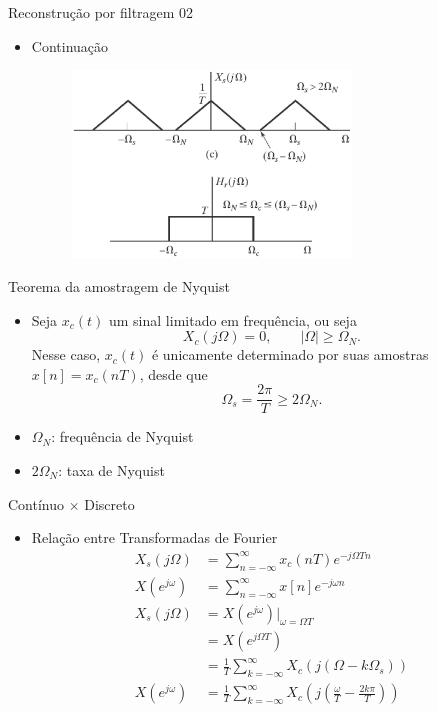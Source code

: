 \documentclass[
size=11pt,
paper=screen,
mode=present,
display=slidesnotes,
style=paintings,
nopagebreaks,
blackslide,
fleqn]{powerdot}
\begin{document}
\begin{slide}{Reconstrução por filtragem 02}
\begin{itemize}
   \item Continuação
   \begin{figure}
      \centering
      \includegraphics[width=0.7\textwidth]{figs/reconstr01a.eps}
   \end{figure}
\end{itemize}
\end{slide}

\begin{slide}{Teorema da amostragem de Nyquist}
\begin{itemize}
   \item Seja $x_c(t)$ um sinal limitado em frequ\^encia, ou seja
   \begin{equation}
       X_c(j\Omega) = 0, \qquad |\Omega|\geq\Omega_N.
   \end{equation}
   Nesse caso, $x_c(t)$ \'e unicamente determinado por suas amostras $x[n]=x_c(nT)$, desde que 
   \begin{equation}
       \Omega_s = \frac{2\pi}{T}\geq 2\Omega_N.
   \end{equation}
   \item $\Omega_N$: frequ\^encia de Nyquist
   \item $2\Omega_N$: taxa de Nyquist
\end{itemize}
\end{slide}

\begin{slide}{Contínuo $\times$ Discreto}
\begin{itemize}
   \item Rela\c c\~ao entre Transformadas de Fourier 
   \begin{align}
      X_s(j\Omega)   &= \sum_{n=-\infty}^{\infty}x_c(nT)e^{-j\Omega Tn}\\
      X(e^{j\omega}) &= \sum_{n=-\infty}^{\infty}x[n]e^{-j\omega n}\\
      X_s(j\Omega)   &= X(e^{j\omega})|_{\omega=\Omega T}\\
                     &= X(e^{j\Omega T}) \\
                     &= \frac{1}{T}\sum_{k=-\infty}^{\infty}X_c(j(\Omega-k\Omega_s))\\
     X(e^{j\omega})& = \frac{1}{T}\sum_{k=-\infty}^{\infty}X_c\left(j\left(\frac{\omega}{T}-\frac{2k\pi}{T}\right )\right )
   \end{align}
\end{itemize}
\end{slide}
\end{document}
